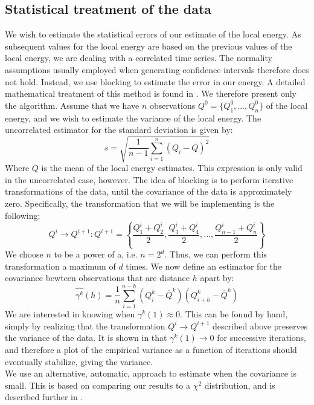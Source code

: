 \documentclass[a4paper, 10pt]{article}
\begin{document}
	\subsection{Statistical treatment of the data}\label{sec:Blocking}
	We wish to estimate the statistical errors of our estimate of the local energy. As subsequent values for the local energy are based on the previous values of the local energy, we are dealing with a correlated time series. The normality assumptions usually employed when generating confidence intervals therefore does not hold. Instead, we use blocking to estimate the error in our energy. A detailed mathematical treatment of this method is found in \cite{Jonsson2018}. We therefore present only the algorithm. Assume that we have $n$ observations $Q^0=\{Q_1^0,...,Q_n^0\}$ of the local energy, and we wish to estimate the variance of the local energy. The uncorrelated estimator for the standard deviation is given by:
	\begin{equation}
	s=\sqrt{\frac{1}{n-1}\sum_{i=1}^n (Q_i-\overline{Q})^2}
	\end{equation}
	Where $\overline{Q}$ is the mean of the local energy estimates. This expression is only valid in the uncorrelated case, however. The idea of blocking is to perform iterative transformations of the data, until the covariance of the data is approximately zero. Specifically, the transformation that we will be implementing is the following:
	\begin{equation}
	Q^i \rightarrow Q^{i+1}: Q^{i+1} = \left\{ \frac{Q^i_1+Q^i_2}{2}, \frac{Q^i_3+Q^i_4}{2},...,\frac{Q^i_{n-1}+Q^i_{n}}{2}\right\}
	\end{equation}
	We choose $n$ to be a power of a, i.e. $n=2^d$. Thus, we can perform this transformation a maximum of $d$ times. We now define an estimator for the covariance bewteen observations that are distance $h$ apart by:
	\begin{equation}
	\hat{\gamma^k}(h)=\frac{1}{n}\sum_{i=1}^{n-h}(Q_i^k-\overline{Q}^k)(Q_{i+h}^k-\overline{Q}^k)
	\end{equation}
	We are interested in knowing when $\gamma^k(1)\approx 0$. This can be found by hand, simply by realizing that the transformation $Q^i \rightarrow Q^{i+1}$ described above preserves the variance of the data. It is shown in \cite{Jonsson2018} that $\gamma^k(1) \rightarrow 0$ for successive iterations, and therefore a plot of the empirical variance as a function of iterations should eventually stabilize, giving the variance. \\
	\linebreak
	We use an alternative, automatic, approach to estimate when the covariance is small. This is based on comparing our results to a $\chi^2$ distribution, and is described further in \cite{Jonsson2018}.
\end{document}
